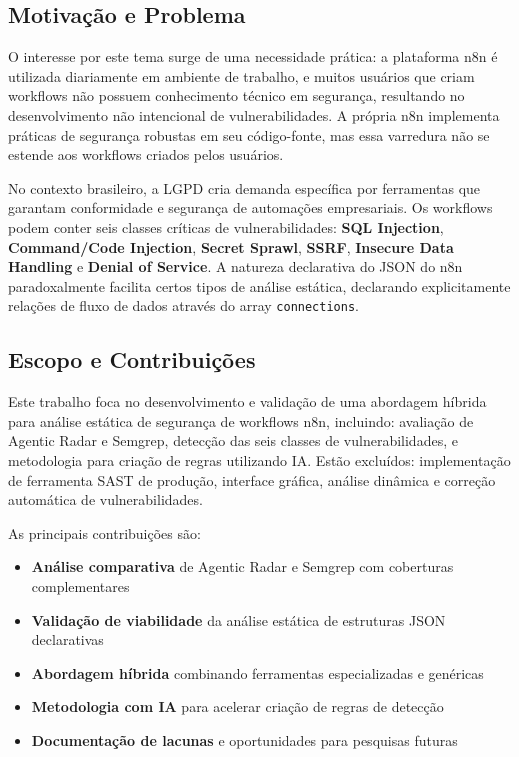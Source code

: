 \documentclass[12pt,a4paper]{article}
\begin{document}
\subsection{Motivação e Problema}

O interesse por este tema surge de uma necessidade prática: a plataforma n8n é utilizada diariamente em ambiente de trabalho, e muitos usuários que criam workflows não possuem conhecimento técnico em segurança, resultando no desenvolvimento não intencional de vulnerabilidades. A própria n8n implementa práticas de segurança robustas em seu código-fonte, mas essa varredura não se estende aos workflows criados pelos usuários.

No contexto brasileiro, a LGPD \cite{lgpd_lei} cria demanda específica por ferramentas que garantam conformidade e segurança de automações empresariais. Os workflows podem conter seis classes críticas de vulnerabilidades: \textbf{SQL Injection}, \textbf{Command/Code Injection}, \textbf{Secret Sprawl}, \textbf{SSRF}, \textbf{Insecure Data Handling} e \textbf{Denial of Service}. A natureza declarativa do JSON do n8n paradoxalmente facilita certos tipos de análise estática, declarando explicitamente relações de fluxo de dados através do array \texttt{connections}.

\subsection{Escopo e Contribuições}

Este trabalho foca no desenvolvimento e validação de uma abordagem híbrida para análise estática de segurança de workflows n8n, incluindo: avaliação de Agentic Radar e Semgrep, detecção das seis classes de vulnerabilidades, e metodologia para criação de regras utilizando IA. Estão excluídos: implementação de ferramenta SAST de produção, interface gráfica, análise dinâmica e correção automática de vulnerabilidades.

As principais contribuições são:
\begin{itemize}[noitemsep,topsep=0pt]
    \item \textbf{Análise comparativa} de Agentic Radar e Semgrep com coberturas complementares
    \item \textbf{Validação de viabilidade} da análise estática de estruturas JSON declarativas
    \item \textbf{Abordagem híbrida} combinando ferramentas especializadas e genéricas
    \item \textbf{Metodologia com IA} para acelerar criação de regras de detecção
    \item \textbf{Documentação de lacunas} e oportunidades para pesquisas futuras
\end{itemize}
\end{document}
